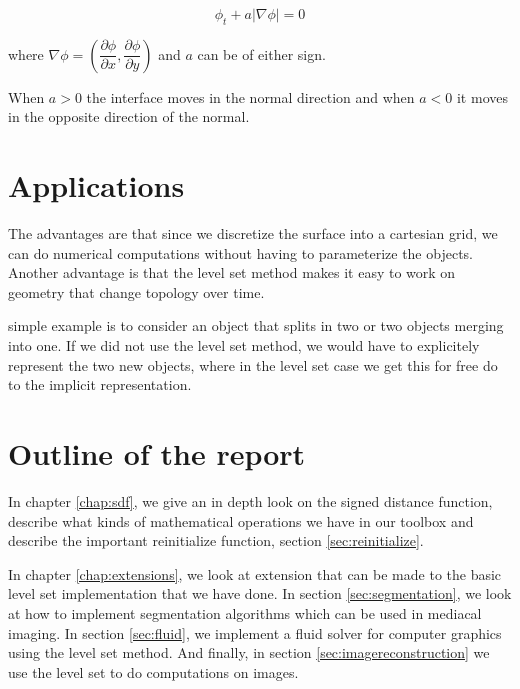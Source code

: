 \begin{equation}
\phi_{t} + a|\nabla \phi| = 0
\end{equation}\label{eq:normMove}

where $\nabla \phi = (\dfrac{\partial \phi}{\partial x},
\dfrac{\partial \phi}{\partial y})$ and $a$ can be of either sign.

When $a > 0$ the interface moves in the normal direction and when $a <
0$ it moves in the opposite direction of the normal.


\section*{Applications}

The advantages are that since we discretize the surface into a
cartesian grid, we can do numerical computations without having to
parameterize the objects. Another advantage is that the level set
method makes it easy to work on geometry that change topology over
time.


simple example is to consider an object that splits in two or two
objects merging into one. If we did not use the level set method, we
would have to explicitely represent the two new objects, where in the
level set case we get this for free do to the implicit representation.


\newpage

\section*{Outline of the report}

In chapter \vref{chap:sdf}, we give an in depth look on the signed
distance function, describe what kinds of mathematical operations we
have in our toolbox and describe the important reinitialize function,
section \vref{sec:reinitialize}.

In chapter \vref{chap:extensions}, we look at extension that can be
made to the basic level set implementation that we have done. In
section \vref{sec:segmentation}, we look at how to implement
segmentation algorithms which can be used in mediacal imaging. In
section \vref{sec:fluid}, we implement a fluid solver for computer
graphics using the level set method. And finally, in section
\vref{sec:imagereconstruction}  we use the level set to do computations
on images.




